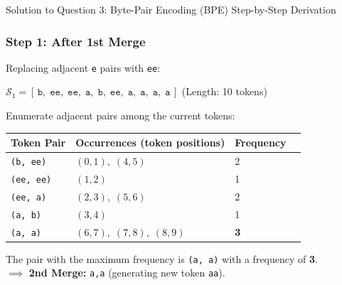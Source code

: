 \documentclass[11pt,a4paper]{article}
\begin{document}
\begin{solutionbox}{Solution to Question 3: Byte-Pair Encoding (BPE) Step-by-Step Derivation}
\subsubsection*{Step 1: After 1st Merge}
Replacing adjacent \texttt{e} pairs with \texttt{ee}:
\begin{center}
    $\mathcal{S}_1 = [\,\texttt{b},\; \texttt{ee},\; \texttt{ee},\; \texttt{a},\; \texttt{b},\; \texttt{ee},\; \texttt{a},\; \texttt{a},\; \texttt{a},\; \texttt{a}\,]$ \quad (Length: 10 tokens)
\end{center}
Enumerate adjacent pairs among the current tokens:
\begin{center}
\small
\begin{tabular}{lll c}
\toprule
\textbf{Token Pair} & \textbf{Occurrences (token positions)} & \textbf{Frequency} \\
\midrule
\texttt{(b, ee)}   & $(0,1),\; (4,5)$ & 2 \\
\texttt{(ee, ee)}  & $(1,2)$ & 1 \\
\texttt{(ee, a)}   & $(2,3),\; (5,6)$ & 2 \\
\texttt{(a, b)}    & $(3,4)$ & 1 \\
\texttt{(a, a)}    & $(6,7),\; (7,8),\; (8,9)$ & \textbf{3} \\
\bottomrule
\end{tabular}
\end{center}
The pair with the maximum frequency is \texttt{(a, a)} with a frequency of \textbf{3}.\\
$\implies$ \textbf{2nd Merge:} \texttt{a,a} (generating new token \texttt{aa}).


\end{solutionbox}
\end{document}
